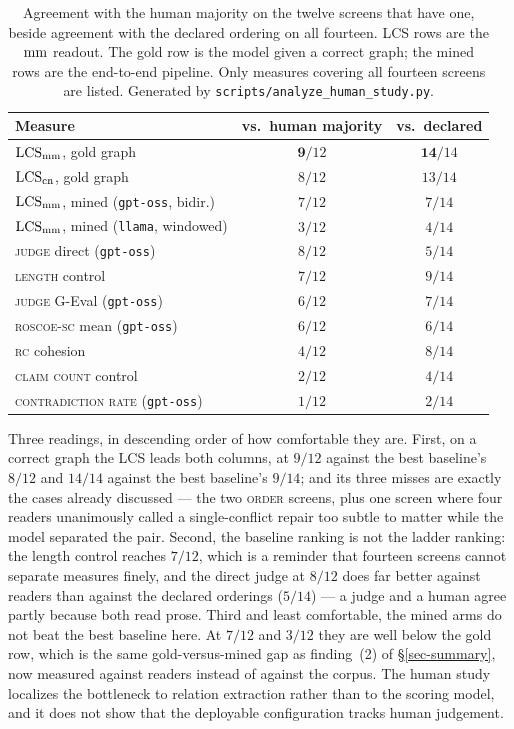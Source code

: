 \begin{table}[tbp]
\centering\small
\caption{Agreement with the human majority on the twelve screens that have one, beside agreement with
  the declared ordering on all fourteen. LCS rows are the $\mathrm{mm}$ readout. The gold row is the model
  given a correct graph; the mined rows are the end-to-end pipeline. Only measures covering all
  fourteen screens are listed. Generated by \texttt{scripts/analyze\_human\_study.py}.}
\label{tab:human-measures}
\begin{tabular}{@{}lcc@{}}
\toprule
Measure & vs.\ human majority & vs.\ declared \\
\midrule
$\mathrm{LCS}_{\mathrm{mm}}$, gold graph                        & $\mathbf{9}/12$ & $\mathbf{14}/14$ \\
$\mathrm{LCS}_{\mathrm{cn}}$, gold graph                      & $8/12$ & $13/14$ \\
\midrule
$\mathrm{LCS}_{\mathrm{mm}}$, mined (\texttt{gpt-oss}, bidir.)  & $7/12$ & $7/14$ \\
$\mathrm{LCS}_{\mathrm{mm}}$, mined (\texttt{llama}, windowed)  & $3/12$ & $4/14$ \\
\midrule
\textsc{judge} direct (\texttt{gpt-oss})        & $8/12$ & $5/14$ \\
\textsc{length} control                         & $7/12$ & $9/14$ \\
\textsc{judge} G-Eval (\texttt{gpt-oss})        & $6/12$ & $7/14$ \\
\textsc{roscoe-sc} mean (\texttt{gpt-oss})      & $6/12$ & $6/14$ \\
\textsc{rc} cohesion                            & $4/12$ & $8/14$ \\
\textsc{claim count} control                    & $2/12$ & $4/14$ \\
\textsc{contradiction rate} (\texttt{gpt-oss})  & $1/12$ & $2/14$ \\
\bottomrule
\end{tabular}
\end{table}

Three readings, in descending order of how comfortable they are. First, on a correct graph the LCS
leads both columns, at $9/12$ against the best baseline's $8/12$ and $14/14$ against the best
baseline's $9/14$; and its three misses are exactly the cases already discussed --- the two
\textsc{order} screens, plus one screen where four readers unanimously called a single-conflict repair
too subtle to matter while the model separated the pair. Second, the baseline ranking is not the
ladder ranking: the length control reaches $7/12$, which is a reminder that fourteen screens cannot
separate measures finely, and the direct judge at $8/12$ does far better against readers than against
the declared orderings ($5/14$) --- a judge and a human agree partly because both read prose. Third
and least comfortable, the mined arms do not beat the best baseline here. At $7/12$ and $3/12$ they
are well below the gold row, which is the same gold-versus-mined gap as finding~(2) of
\S\ref{sec-summary}, now measured against readers instead of against the corpus. The human study
localizes the bottleneck to relation extraction rather than to the scoring model, and it does not show
that the deployable configuration tracks human judgement.

